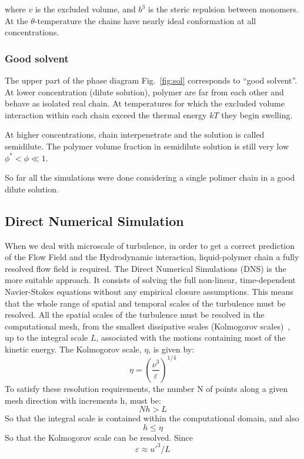 where $v$ is the excluded volume, and $b^3$ is the steric repulsion between monomers.
At the $\theta$-temperature the chains have nearly ideal conformation at all concentrations.

\subsubsection{Good solvent}
The upper part of the phase diagram Fig.~\ref{fig:sol} corresponds to ``good solvent''.
At lower concentration (dilute solution), polymer are far from each other and behave as isolated real chain.
At temperatures for which the excluded volume interaction within each chain exceed the thermal energy $kT$ they begin swelling.

At higher concentrations, chain interpenetrate and the solution is called semidilute. The polymer volume fraction in semidilute solution is still very low $\phi^{*} < \phi \ll 1$. 


So far all the simulations were done considering a single polimer chain in a good dilute solution. 




\subsection{Direct Numerical Simulation}\label{sec:dns}

When we deal with microscale of turbulence, in order to get a correct prediction of the Flow Field and 
the Hydrodynamic interaction, liquid-polymer chain a fully resolved flow field is required.
The Direct Numerical Simulations (DNS) is the more suitable approach.
It consists of solving the full non-linear, time-dependent Navier-Stokes equations without any empirical closure assumptions.
This means that the whole range of spatial and temporal scales of the turbulence must be resolved.
All the spatial scales of the turbulence must be resolved in the computational mesh, from the smallest dissipative scales (Kolmogorov scales)~\cite{dns,pope}, up to the integral scale $L$, associated with the motions containing most of the kinetic energy. The Kolmogorov scale, $\eta$, is given by:
\begin{equation}
\eta = \left( \frac{\nu^3}{\varepsilon} \right)^{1/4}
\label{eq:kscale}
\end{equation}
To satisfy these resolution requirements, the number N of points along a given mesh direction with increments h, must be: 
\begin{equation}
Nh > L
\label{cond1}
\end{equation}
So that the integral scale is contained within the computational domain, and also
\begin{equation}
h\leq\eta
\end{equation}
So that the Kolmogorov scale can be resolved. Since
\begin{equation}
\varepsilon \approx u'^3/L
\end{equation}

